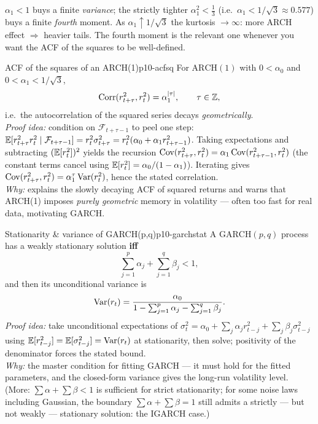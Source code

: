 \begin{intuition}
$\alpha_1<1$ buys a finite \emph{variance}; the strictly tighter
$\alpha_1^2<\tfrac13$ (i.e.\ $\alpha_1<1/\sqrt3\approx0.577$) buys a finite
\emph{fourth} moment. As $\alpha_1\uparrow 1/\sqrt3$ the kurtosis
$\to\infty$: more ARCH effect $\Rightarrow$ heavier tails. The fourth moment is
the relevant one whenever you want the ACF of the squares to be well-defined.
\end{intuition}

\begin{proposition}{ACF of the squares of an ARCH(1)}{p10-acfsq}
For $\mathrm{ARCH}(1)$ with $0<\alpha_0$ and $0<\alpha_1<1/\sqrt3$,
\[
\operatorname{Corr}(r_{t+\tau}^2,r_t^2)=\alpha_1^{\left\lvert \tau \right\rvert},\qquad \tau\in\mathbb{Z},
\]
i.e.\ the autocorrelation of the squared series decays \emph{geometrically}.\\
\textit{Proof idea:} condition on $\mathcal F_{t+\tau-1}$ to peel one step:
$\mathbb{E}[r_{t+\tau}^2 r_t^2\mid\mathcal F_{t+\tau-1}]=r_t^2\sigma_{t+\tau}^2
=r_t^2(\alpha_0+\alpha_1 r_{t+\tau-1}^2)$. Taking expectations and subtracting
$(\mathbb{E}[r_t^2])^2$ yields the recursion
$\operatorname{Cov}(r_{t+\tau}^2,r_t^2)=\alpha_1\operatorname{Cov}(r_{t+\tau-1}^2,r_t^2)$ (the constant terms
cancel using $\mathbb{E}[r_t^2]=\alpha_0/(1-\alpha_1)$). Iterating gives
$\operatorname{Cov}(r_{t+\tau}^2,r_t^2)=\alpha_1^{\tau}\operatorname{Var}(r_t^2)$, hence the stated
correlation.\\
\textit{Why:} explains the slowly decaying ACF of squared returns and warns that
ARCH(1) imposes \emph{purely geometric} memory in volatility --- often too fast
for real data, motivating GARCH.
\end{proposition}

\begin{proposition}{Stationarity \& variance of GARCH(p,q)}{p10-garchstat}
A $\mathrm{GARCH}(p,q)$ process has a weakly stationary solution \textbf{iff}
\[
\sum_{j=1}^{p}\alpha_j+\sum_{j=1}^{q}\beta_j<1,
\]
and then its unconditional variance is
\[
\operatorname{Var}(r_t)=\frac{\alpha_0}{1-\sum_{j=1}^{p}\alpha_j-\sum_{j=1}^{q}\beta_j}.
\]
\textit{Proof idea:} take unconditional expectations of
$\sigma_t^2=\alpha_0+\sum_j\alpha_j r_{t-j}^2+\sum_j\beta_j\sigma_{t-j}^2$ using
$\mathbb{E}[r_{t-j}^2]=\mathbb{E}[\sigma_{t-j}^2]=\operatorname{Var}(r_t)$ at stationarity, then solve; positivity
of the denominator forces the stated bound.\\
\textit{Why:} the master condition for fitting GARCH --- it must hold for the
fitted parameters, and the closed-form variance gives the long-run volatility
level. (More: $\sum\alpha+\sum\beta<1$ is sufficient for strict stationarity; for
some noise laws including Gaussian, the boundary $\sum\alpha+\sum\beta=1$ still
admits a strictly --- but not weakly --- stationary solution: the IGARCH case.)
\end{proposition}


